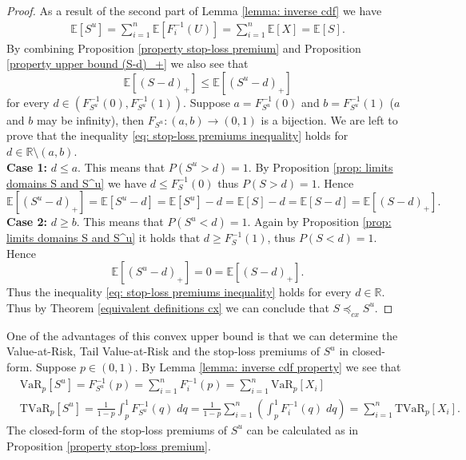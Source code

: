 \documentclass{article}
\begin{document}
\begin{proof} 
    As a result of the second part of Lemma \ref{lemma: inverse cdf} we have
    \begin{align*}
        \mathbb{E}[S^u] = \sum_{i=1}^n\mathbb{E}[F^{-1}_i(U)] = \sum_{i=1}^n\mathbb{E}[X] = \mathbb{E}[S].
    \end{align*}
    By combining Proposition \ref{property stop-loss premium} and Proposition \ref{property upper bound (S-d)_+} we also see that 
    \begin{equation}\label{eq: stop-loss premiums inequality}
    \mathbb{E}[(S-d)_+] \leq \mathbb{E}[(S^u-d)_+]
    \end{equation}
    for every  $d\in (F_{S^u}^{-1}(0), F_{S^u}^{-1}(1))$. Suppose $a = F_{S^u}^{-1}(0)$ and $b = F_{S^u}^{-1}(1)$ ($a$ and $b$ may be infinity), then  $F_{S^u}: (a,b) \rightarrow (0,1)$ is a bijection. We are left to prove that the inequality \eqref{eq: stop-loss premiums inequality} holds for $d\in \mathbb{R}\setminus(a,b)$.\\
    \textbf{Case 1:} $d \leq a$. This means that $P(S^u > d) = 1$. By Proposition \ref{prop: limits domains S and S^u} we have $d\leq F_S^{-1}(0)$ thus $P(S > d) = 1$. Hence
    $$\mathbb{E}[(S^u - d)_+] = \mathbb{E}[S^u - d] = \mathbb{E}[S^u] - d = \mathbb{E}[S] - d = \mathbb{E}[S-d] = \mathbb{E}[(S-d)_+].$$
    \textbf{Case 2:} $d \geq b$. This means that $P(S^u < d) = 1$. Again by Proposition \ref{prop: limits domains S and S^u} it holds that $d \geq F_S^{-1}(1)$, thus $P(S < d) = 1$. Hence
    $$\mathbb{E}[(S^u - d)_+] = 0 = \mathbb{E}[(S-d)_+].$$
    Thus the inequality \eqref{eq: stop-loss premiums inequality} holds for every $d\in\mathbb{R}$. Thus by Theorem \ref{equivalent definitions cx} we can conclude that $S \preceq_{cx} S^u$.
\end{proof}
One of the advantages of this convex upper bound is that we can determine the Value-at-Risk, Tail Value-at-Risk and the stop-loss premiums of $S^u$ in closed-form. Suppose $p\in (0,1)$. By Lemma \ref{lemma: inverse cdf property} we see that
\begin{align*}
&\text{VaR}_p[S^u] = F^{-1}_{S^u}(p) = \sum_{i=1}^nF_i^{-1}(p) = \sum_{i=1}^n\text{VaR}_p[X_i]\\
&\text{TVaR}_p[S^u] = \frac{1}{1-p}\int_p^1F^{-1}_{S^u}(q)\;dq = \frac{1}{1-p}\sum_{i=1}^n\left(\int_p^1F_i^{-1}(q)\;dq\right) = \sum_{i=1}^n\text{TVaR}_p[X_i].
\end{align*}
The closed-form of the stop-loss premiums of $S^u$ can be calculated as in Proposition \ref{property stop-loss premium}.
\end{document}
